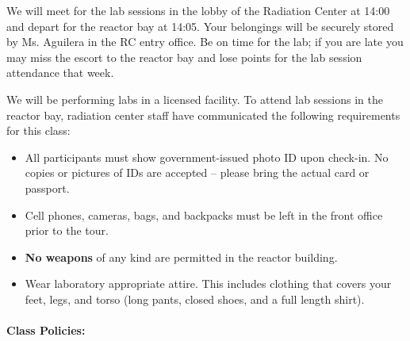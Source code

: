 \documentclass[11pt, a4paper]{article}
\begin{document}
We will meet for the lab sessions in the lobby of the Radiation Center at 14:00 and depart for the reactor bay at 14:05. Your belongings will be securely stored by Ms. Aguilera in the RC entry office. Be on time for the lab; if you are late you may miss the escort to the reactor bay and lose points for the lab session attendance that week. 

We will be performing labs in a licensed facility. To attend lab sessions in the reactor bay, radiation center staff have communicated the following requirements for this class:

\begin{itemize}
\item All participants must show government-issued photo ID upon check-in. No copies or pictures of IDs are accepted -- please bring the actual card or passport. 
\item Cell phones, cameras, bags, and backpacks must be left in the front office prior to the tour. 
\item \textbf{No weapons} of any kind are permitted in the reactor building. 
\item Wear laboratory appropriate attire. This includes clothing that covers your feet, legs, and torso (long pants, closed shoes, and a full length shirt). 
\end{itemize} 


\paragraph{Class Policies:}
\end{document}
